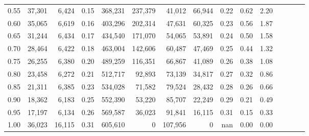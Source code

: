 \begin{tabular}{rrrcrrrrrrrrrrr}
0.55 &  37,301 &   6,424 &                                       0.15 &  368,231 &  237,379 &   41,012 &   66,944 &  0.22 &  0.62 &                         2.20 \\
0.60 &  35,065 &   6,619 &                                       0.16 &  403,296 &  202,314 &   47,631 &   60,325 &  0.23 &  0.56 &                         1.87 \\
0.65 &  31,244 &   6,434 &                                       0.17 &  434,540 &  171,070 &   54,065 &   53,891 &  0.24 &  0.50 &                         1.58 \\
0.70 &  28,464 &   6,422 &                                       0.18 &  463,004 &  142,606 &   60,487 &   47,469 &  0.25 &  0.44 &                         1.32 \\
0.75 &  26,255 &   6,380 &                                       0.20 &  489,259 &  116,351 &   66,867 &   41,089 &  0.26 &  0.38 &                         1.08 \\
0.80 &  23,458 &   6,272 &                                       0.21 &  512,717 &   92,893 &   73,139 &   34,817 &  0.27 &  0.32 &                         0.86 \\
0.85 &  21,311 &   6,385 &                                       0.23 &  534,028 &   71,582 &   79,524 &   28,432 &  0.28 &  0.26 &                         0.66 \\
0.90 &  18,362 &   6,183 &                                       0.25 &  552,390 &   53,220 &   85,707 &   22,249 &  0.29 &  0.21 &                         0.49 \\
0.95 &  17,197 &   6,134 &                                       0.26 &  569,587 &   36,023 &   91,841 &   16,115 &  0.31 &  0.15 &                         0.33 \\
1.00 &  36,023 &  16,115 &                                       0.31 &  605,610 &        0 &  107,956 &        0 &   nan &  0.00 &                         0.00 \\
\bottomrule
\end{tabular}
